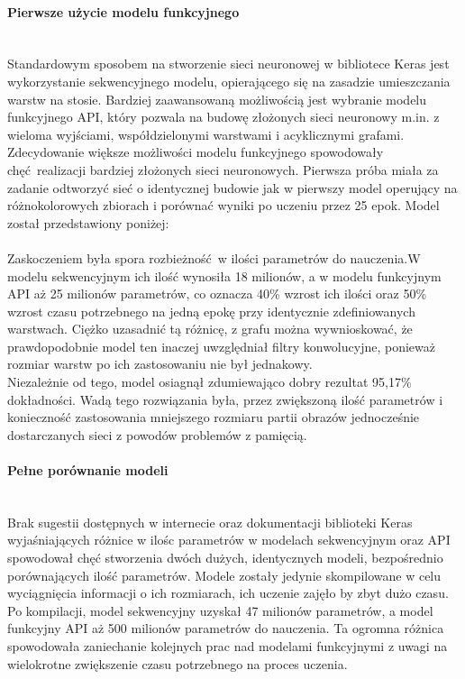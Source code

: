 \paragraph{Pierwsze użycie modelu funkcyjnego} \mbox{}\\
Standardowym sposobem na stworzenie sieci neuronowej w bibliotece Keras jest wykorzystanie
sekwencyjnego modelu, opierającego się na zasadzie umieszczania warstw na stosie. Bardziej
zaawansowaną możliwością jest wybranie modelu funkcyjnego API, który pozwala na budowę złożonych
sieci neuronowy m.in. z wieloma wyjściami, współdzielonymi warstwami i acyklicznymi grafami.\\
Zdecydowanie większe możliwości modelu funkcyjnego spowodowały chęć realizacji bardziej złożonych
sieci neuronowych. Pierwsza próba miała za zadanie odtworzyć sieć o identycznej budowie jak w
pierwszy model operujący na różnokolorowych zbiorach i porównać wyniki po uczeniu przez 25 epok.
Model został przedstawiony poniżej:\\\\
Zaskoczeniem była spora rozbieżność w ilości parametrów do nauczenia.W modelu sekwencyjnym
ich ilość wynosiła 18 milionów, a w modelu funkcyjnym API aż 25 milionów parametrów, co oznacza
40\% wzrost ich ilości oraz 50\% wzrost czasu potrzebnego na jedną epokę przy identycznie
zdefiniowanych warstwach. Ciężko uzasadnić tą różnicę, z grafu można wywnioskować, że
prawdopodobnie model ten inaczej uwzględniał filtry konwolucyjne, ponieważ rozmiar warstw
po ich zastosowaniu nie był jednakowy.\\
Niezależnie od tego, model osiagnął zdumiewająco dobry rezultat 95,17\% dokładności.
Wadą tego rozwiązania była, przez zwiększoną ilość parametrów i konieczność zastosowania
mniejszego rozmiaru partii obrazów jednocześnie dostarczanych sieci z powodów
problemów z pamięcią.

\paragraph{Pełne porównanie modeli} \mbox{}\\
Brak sugestii dostępnych w internecie oraz dokumentacji biblioteki Keras wyjaśniających różnice
w ilośc parametrów w modelach sekwencyjnym oraz API spowodował chęć stworzenia dwóch dużych,
identycznych modeli, bezpośrednio porównających ilość parametrów. Modele zostały jedynie
skompilowane w celu wyciągnięcia informacji o ich rozmiarach, ich uczenie zajęło by zbyt dużo czasu.\\
Po kompilacji, model sekwencyjny uzyskał 47 milionów parametrów, a model funkcyjny API
aż 500 milionów parametrów do nauczenia. Ta ogromna różnica spowodowała zaniechanie
kolejnych prac nad modelami funkcyjnymi z uwagi na wielokrotne zwiększenie czasu potrzebnego
na proces uczenia.

